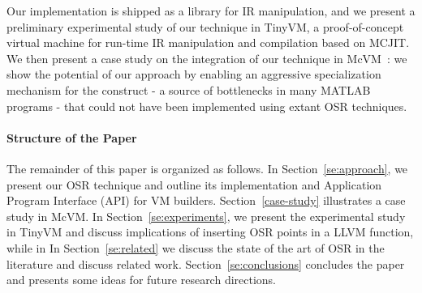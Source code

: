 Our implementation is shipped as a library for IR manipulation, and we present a preliminary experimental study of our technique in TinyVM, a proof-of-concept virtual machine for run-time IR manipulation and compilation based on MCJIT. We then present a case study on the integration of our technique in McVM~\cite{chevalier2010mcvm}: we show the potential of our approach by enabling an aggressive specialization mechanism for the \feval construct - a source of bottlenecks in many MATLAB programs - that could not have been implemented using extant OSR techniques.

\paragraph{Structure of the Paper}
The remainder of this paper is organized as follows. In Section~\ref{se:approach}, we present our OSR technique and outline its implementation and Application Program Interface (API) for VM builders. Section~\ref{case-study} illustrates a case study in McVM. In Section~\ref{se:experiments}, we present the experimental study in TinyVM and discuss implications of inserting OSR points in a LLVM function, while in In Section~\ref{se:related} we discuss the state of the art of OSR in the literature and discuss related work. Section~\ref{se:conclusions} concludes the paper and presents some ideas for future research directions. 
  
  
  
  
  
  